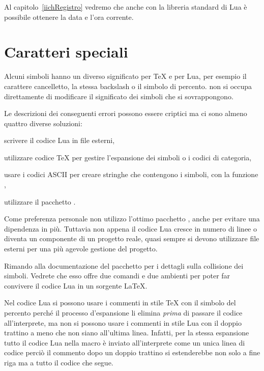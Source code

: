 Al capitolo~\ref{iichRegistro} vedremo che anche con la libreria standard di Lua
è possibile ottenere la data e l'ora corrente.


\section{Caratteri speciali}

Alcuni simboli hanno un diverso significato per \TeX{} e per Lua, per esempio il
carattere cancelletto, la stessa backslash o il simbolo di percento. \LuaTeX{}
non si occupa direttamente di modificare il significato dei simboli che si
sovrappongono.

Le descrizioni dei conseguenti errori possono essere criptici ma ci sono almeno
quattro diverse soluzioni:
\begin{compactitemize}
\item scrivere il codice Lua in file esterni,
\item utilizzare codice \TeX{} per gestire l'espansione dei simboli o i codici
di categoria,
\item usare i codici ASCII per creare stringhe che contengono i simboli, con la
funzione ,
\item utilizzare il pacchetto .
\end{compactitemize}

Come preferenza personale non utilizzo l'ottimo pacchetto ,
anche per evitare una dipendenza in più. Tuttavia non appena il codice Lua
cresce in numero di linee o diventa un componente di un progetto reale, quasi
sempre si devono utilizzare file esterni per una più agevole gestione del
progetto.

Rimando alla documentazione del pacchetto  per i dettagli sulla
collisione dei simboli. Vedrete che esso offre due comandi e due ambienti per
poter far convivere il codice Lua in un sorgente \LaTeX.

Nel codice Lua si possono usare i commenti in stile \TeX{} con il simbolo del
percento perché il processo d'espansione li elimina \emph{prima} di passare il
codice all'interprete, ma non si possono usare i commenti in stile Lua con il
doppio trattino a meno che non siano all'ultima linea. Infatti, per la stessa
espansione tutto il codice Lua nella macro  è inviato
all'interprete come un unica linea di codice perciò il commento dopo un doppio
trattino si estenderebbe non solo a fine riga ma a tutto il codice che segue.

